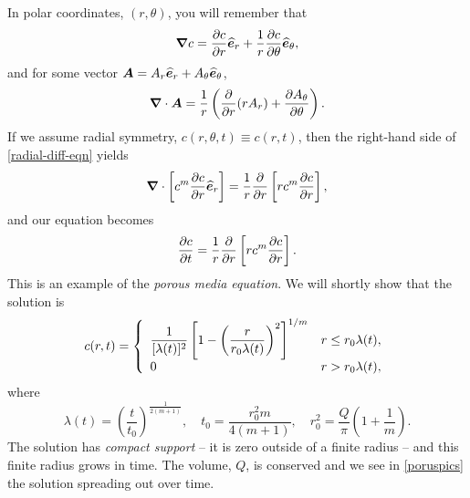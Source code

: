 \documentclass[main.tex]{subfiles}
\begin{document}
In polar coordinates, $(r,\theta)$, you will remember that
\begin{equation}
\vgrad c = \pd{c}{r}\uv{e}_r  + \frac{1}{r}\pd{c}{\theta}\uv{e}_\theta,
\end{equation}
and for some vector $\v{A} = A_r\uv{e}_r + A_{\theta}\uv{e}_\theta$,
\begin{equation}
\vdel\cdot\v{A} = \frac{1}{r}\left(\pd{}{r}(rA_r) + \pd{A_{\theta}}{\theta}\right).
\end{equation}
If we assume radial symmetry, $c(r,\theta,t) \equiv c(r,t)$, then the right-hand side of \cref{radial-diff-eqn} yields
\begin{equation}
\label{porusradial}
\vdel\cdot\left[c^m\pd{c}{r} \uv{e}_r\right] = \frac{1}{r}\pd{}{r}\left[rc^m\pd{c}{r} \right],
\end{equation}
and our equation becomes
\begin{equation}
	\label{porous-media-eqn}
	\pd{c}{t} = \frac{1}{r}\pd{}{r}\left[rc^m\pd{c}{r} \right].
\end{equation}
This is an example of the \emph{porous media equation}. We will shortly show that the solution is
\begin{equation}
\label{porussol}
c(r,t) = \twopartdef{\displaystyle\frac{1}{[\lambda(t)]^2}\left[1 - \left(\frac{r}{r_0 \lambda(t)}\right)^2\right]^{1/m}}{r\leq r_0\lambda(t) ,}{0}{r > r_0 \lambda(t) ,}
\end{equation}
where
\begin{equation}
\lambda(t) = \left(\frac{t}{t_0}\right)^{\frac{1}{2(m+1)}}, \quad t_0 = \frac{r_0^2 m}{4(m+1)}, \quad r_0^2=\frac{Q}{\pi}\left(1+\frac{1}{m}\right).
\end{equation}
The solution has \emph{compact support} -- it is zero outside of a finite radius -- and this finite radius grows in time. The volume, $Q$, is conserved and we see in \cref{poruspics} the solution spreading out over time.
\end{document}
